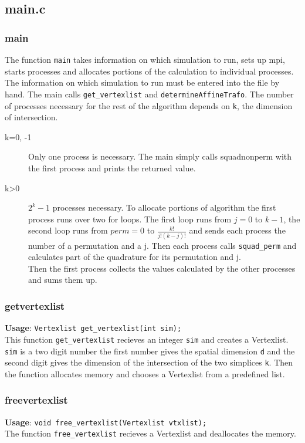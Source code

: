 \documentclass[a4paper,10pt]{article}
\begin{document}
\subsection{main.c}
\subsubsection{main}
The function \verb=main= takes information on which simulation to run, sets up mpi, starts processes
 and allocates portions of the calculation to individual processes.
The information on which simulation to run must be entered into the file by hand.
The main calls \verb=get_vertexlist= and \verb=determineAffineTrafo=.
The number of processes necessary for the rest of the algorithm depends on \verb=k=, 
the dimension of intersection.
\begin{description}
\item[k=0, -1] Only one process is necessary. The main simply calls squad\textunderscore nonperm with the first process
                 and prints the returned value.
\item[k>0] $2^{k}-1$ processes necessary. To allocate portions of algorithm the first process runs over two 
for loops. The first loop runs from $j = 0$ to $k-1$, the second loop runs from $perm=0$ to 
$\frac{k!}{j!(k-j)!}$ and sends each process the number of a permutation and a j. Then each process calls 
\verb=squad_perm= and calculates part of the quadrature for its permutation and j.\\
Then the first process collects the values calculated by the other processes and sums them up.                
\end{description}
 
\subsubsection{get\textunderscore vertexlist}
\textbf{Usage}: \verb=Vertexlist get_vertexlist(int sim);=\\
This function \verb=get_vertexlist= recieves an integer \verb=sim= and creates a Vertexlist. \verb=sim= is
a two digit number the first number gives the spatial dimension \verb=d= and the second digit gives
the dimension of the intersection of the two simplices \verb=k=. Then the function allocates memory and
chooses a Vertexlist from a predefined list.
\subsubsection{free\textunderscore vertexlist}
\textbf{Usage}: \verb=void free_vertexlist(Vertexlist vtxlist);=\\
The function \verb=free_vertexlist= recieves a Vertexlist and deallocates the memory.
\end{document}
